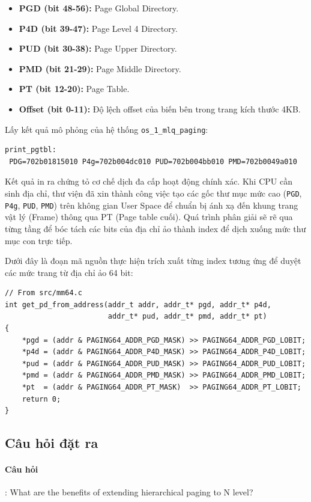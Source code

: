 \documentclass[a4paper]{article}
\begin{document}
\begin{itemize}
    \item \textbf{PGD (bit 48-56):} Page Global Directory.
    \item \textbf{P4D (bit 39-47):} Page Level 4 Directory.
    \item \textbf{PUD (bit 30-38):} Page Upper Directory.
    \item \textbf{PMD (bit 21-29):} Page Middle Directory.
    \item \textbf{PT (bit 12-20):} Page Table.
    \item \textbf{Offset (bit 0-11):} Độ lệch offset của biến bên trong trang kích thước 4KB.
\end{itemize}

Lấy kết quả mô phỏng của hệ thống \texttt{os\_1\_mlq\_paging}:
\begin{verbatim}
print_pgtbl:
 PDG=702b01815010 P4g=702b004dc010 PUD=702b004bb010 PMD=702b0049a010
\end{verbatim}

Kết quả in ra chứng tỏ cơ chế dịch đa cấp hoạt động chính xác. Khi CPU cần sinh địa chỉ, thư viện đã xin thành công việc tạo các gốc thư mục mức cao (\texttt{PGD}, \texttt{P4g}, \texttt{PUD}, \texttt{PMD}) trên không gian User Space để chuẩn bị ánh xạ đến khung trang vật lý (Frame) thông qua PT (Page table cuối). Quá trình phân giải sẽ rẽ qua từng tầng để bóc tách các bits của địa chỉ ảo thành index để dịch xuống mức thư mục con trực tiếp.

Dưới đây là đoạn mã nguồn thực hiện trích xuất từng index tương ứng để duyệt các mức trang từ địa chỉ ảo 64 bit:

\begin{verbatim}
// From src/mm64.c
int get_pd_from_address(addr_t addr, addr_t* pgd, addr_t* p4d, 
                        addr_t* pud, addr_t* pmd, addr_t* pt)
{
    *pgd = (addr & PAGING64_ADDR_PGD_MASK) >> PAGING64_ADDR_PGD_LOBIT;
    *p4d = (addr & PAGING64_ADDR_P4D_MASK) >> PAGING64_ADDR_P4D_LOBIT;
    *pud = (addr & PAGING64_ADDR_PUD_MASK) >> PAGING64_ADDR_PUD_LOBIT;
    *pmd = (addr & PAGING64_ADDR_PMD_MASK) >> PAGING64_ADDR_PMD_LOBIT;
    *pt  = (addr & PAGING64_ADDR_PT_MASK)  >> PAGING64_ADDR_PT_LOBIT;
    return 0;
}
\end{verbatim}

\subsection{Câu hỏi đặt ra}
\paragraph{Câu hỏi}: What are the benefits of extending hierarchical paging to N level?
\end{document}
